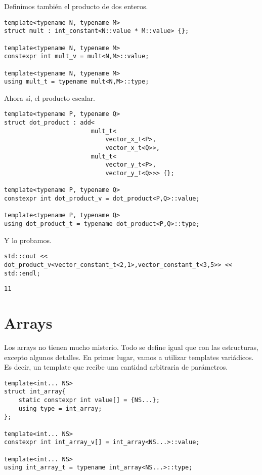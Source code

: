 \documentclass[11pt]{article}
\begin{document}
Definimos también el producto de dos enteros.

\begin{verbatim}
template<typename N, typename M>
struct mult : int_constant<N::value * M::value> {};

template<typename N, typename M>
constexpr int mult_v = mult<N,M>::value;

template<typename N, typename M>
using mult_t = typename mult<N,M>::type;
\end{verbatim}

Ahora sí, el producto escalar.

\begin{verbatim}
template<typename P, typename Q>
struct dot_product : add<
						mult_t<
							vector_x_t<P>,
							vector_x_t<Q>>,
						mult_t<
							vector_y_t<P>,
							vector_y_t<Q>>> {};

template<typename P, typename Q>
constexpr int dot_product_v = dot_product<P,Q>::value;

template<typename P, typename Q>
using dot_product_t = typename dot_product<P,Q>::type;
\end{verbatim}

Y lo probamos.

\begin{verbatim}
std::cout << dot_product_v<vector_constant_t<2,1>,vector_constant_t<3,5>> << std::endl;
\end{verbatim}

\begin{verbatim}
11
\end{verbatim}

\section{Arrays}
\label{sec:org7d48da7}
Los arrays no tienen mucho misterio. Todo se define igual que con las estructuras, excepto algunos detalles. En primer lugar, vamos a utilizar templates variádicos. Es decir, un template que recibe una cantidad arbitraria de parámetros.

\begin{verbatim}
template<int... NS>
struct int_array{
	static constexpr int value[] = {NS...};
	using type = int_array;
};

template<int... NS>
constexpr int int_array_v[] = int_array<NS...>::value;

template<int... NS>
using int_array_t = typename int_array<NS...>::type;
\end{verbatim}
\end{document}
